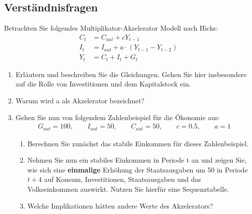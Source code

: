 \documentclass{scrartcl}
\begin{document}
\subsection{Verständnisfragen}
Betrachten Sie folgendes Multiplikator-Akzelerator Modell nach Hicks:
\begin{align*}
C_t &= C_{aut} + c Y_{t-1}\\
I_t &= I_{aut} + a\cdot (Y_{t-1}-Y_{t-2})\\
Y_t &= C_t + I_t + G_t
\end{align*}
\begin{enumerate}
	\item Erläutern und beschreiben Sie die Gleichungen. Gehen Sie hier insbesondere auf die Rolle von Investitionen und dem Kapitalstock ein.
	\item Warum wird a als Akzelerator bezeichnet?
	\item Gehen Sie nun von folgendem Zahlenbeispiel für die Ökonomie aus:
	\begin{align*}
	G_{aut} = 100, \qquad I_{aut}=50, \qquad C_{aut}=50, \qquad c= 0.5, \qquad a =1
	\end{align*}
	\begin{enumerate}
		\item Berechnen Sie zunächst das stabile Einkommen für dieses Zahlenbeispiel.
		\item Nehmen Sie nun ein stabiles Einkommen in Periode t an und zeigen Sie, wie sich eine \textbf{einmalige} Erhöhung der Staatsausgaben um 50 in Periode $t+4$ auf Konsum, Investitionen, Staatsausgaben und das Volkseinkommen auswirkt. Nutzen Sie hierfür eine Sequenztabelle.
		\item Welche Implikationen hätten andere Werte des Akzelerators?
	\end{enumerate}
\end{enumerate}
\end{document}
